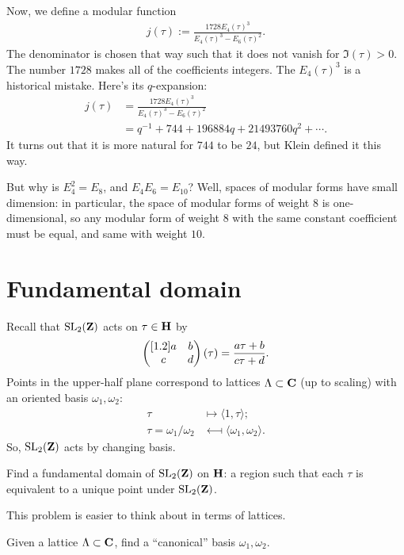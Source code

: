 \documentclass[11pt, oneside,margin=1in]{article}
\begin{document}
\begin{example}[ ]
Now, we define a modular function
 \begin{align*}
	j(\tau) :=  \frac{1728E_4(\tau)^3}{E_4(\tau)^3 -  E_6(\tau)^2}.
\end{align*}
The denominator is chosen that way such that it does not vanish for $\Im(\tau)>0$. The number $1728$ makes all of the coefficients integers. The $E_4(\tau)^3$ is a historical mistake. Here's its  $q$-expansion:
\begin{align*}
	j(\tau) &=  \frac{1728E_4(\tau)^3}{E_4(\tau)^3 -  E_6(\tau)^2}\\
		&= q^{-1} + 744 + 196884 q +21493760q^2+\cdots. 
\end{align*}
It turns out that it is more natural for $744$ to be $24$, but Klein defined it this way.

But why is $E_4^2 = E_8$, and $E_4E_6=E_{10}$? Well, spaces of modular forms have small dimension: in particular, the space of modular forms of weight $8$ is one-dimensional, so any modular form of weight $8$ with the same constant coefficient must be equal, and same with weight $10$.
\end{example}

\section{Fundamental domain}
Recall that $\operatorname{SL}_{2}(\mathbf Z)$ acts on $\tau \in \mathbf H$ by
\begin{align*}
	\begin{pmatrix} [ 1.2 ] a&b\\c&d\end{pmatrix}(\tau) =  \frac{a\tau+b}{c\tau + d}.
\end{align*}
Points in the upper-half plane correspond to lattices $\Lambda\subset \mathbf C$ (up to scaling) with an oriented basis $\omega_1,\omega_2$: \begin{align*}
	\tau &\longmapsto \langle 1,\tau\rangle;\\
	\tau = \omega_1/\omega_2 &\longmapsfrom \langle \omega_1,\omega_2\rangle.
\end{align*}
So, $\operatorname{SL}_{2}(\mathbf Z)$ acts by changing basis.

\begin{problem}
	Find a fundamental domain of $\operatorname{SL}_{2}(\mathbf Z)$ on $\mathbf H$: a region such that each $\tau$ is equivalent to a unique point under $\operatorname{SL}_{2}(\mathbf Z)$.
\end{problem}

This problem is easier to think about in terms of lattices.

\begin{problem}
	Given a lattice $\Lambda \subset \mathbf C$, find a ``canonical'' basis $\omega_1,\omega_2$.
\end{problem}
\end{document}
